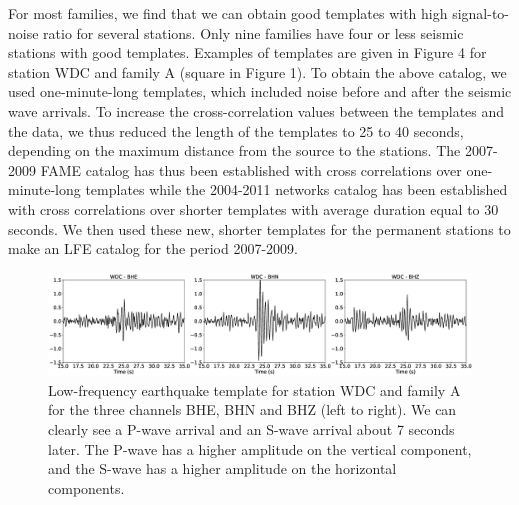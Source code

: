 \documentclass[draft]{agujournal2019}
\begin{document}
For most families, we find that we can obtain good templates with high signal-to-noise ratio for several stations. Only nine families have four or less seismic stations with good templates. Examples of templates are given in Figure 4 for station WDC and family A (square in Figure 1). To obtain the above catalog, we used one-minute-long templates, which included noise before and after the seismic wave arrivals. To increase the cross-correlation values between the templates and the data, we thus reduced the length of the templates to 25 to 40 seconds, depending on the maximum distance from the source to the stations. The 2007-2009 FAME catalog has thus been established with cross correlations over one-minute-long templates while the 2004-2011 networks catalog has been established with cross correlations over shorter templates with average duration equal to 30 seconds. We then used these new, shorter templates for the permanent stations to make an LFE catalog for the period 2007-2009. \\

\begin{figure}
\noindent\includegraphics[width=\textwidth, trim={0cm 0cm 0cm 0cm},clip]{figures/templates.eps}
\caption{Low-frequency earthquake template for station WDC and family A for the three channels BHE, BHN and BHZ (left to right). We can clearly see a P-wave arrival and an S-wave arrival about 7 seconds later. The P-wave has a higher amplitude on the vertical component, and the S-wave has a higher amplitude on the horizontal components.}
\label{pngfiguresample}
\end{figure}

\end{document}
